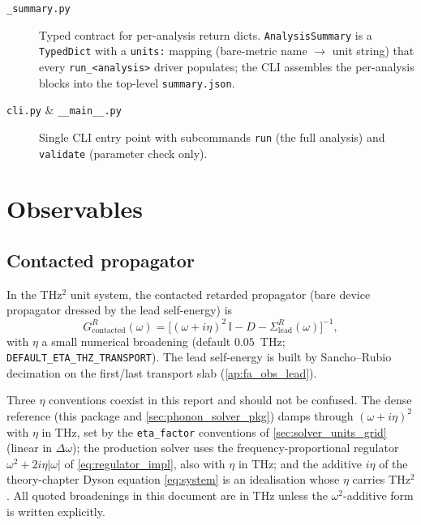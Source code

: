 \begin{description}
\item[\texttt{\_summary.py}] Typed contract for per-analysis return
  dicts.  \texttt{AnalysisSummary} is a \texttt{TypedDict} with a
  \texttt{units:} mapping (bare-metric name $\to$ unit string) that
  every \texttt{run\_<analysis>} driver populates; the CLI assembles
  the per-analysis blocks into the top-level \texttt{summary.json}.

\item[\texttt{cli.py} \& \texttt{\_\_main\_\_.py}] Single CLI entry point
  with subcommands \texttt{run} (the full analysis) and
  \texttt{validate} (parameter check only).
\end{description}

\section{Observables}
\label{ap:fa_observables}

\subsection{Contacted propagator}
\label{ap:fa_obs_bare}

In the THz$^2$ unit system, the contacted retarded propagator
(bare device propagator dressed by the lead self-energy) is
\begin{equation}
  \label{eq:gf_retarded_bare}
  G^R_{\mathrm{contacted}}(\omega) =
  \bigl[(\omega + i\eta)^2\,\mathbb{I} - D - \Sigma^R_{\mathrm{lead}}(\omega)\bigr]^{-1},
\end{equation}
with $\eta$ a small numerical broadening (default
$0.05$~THz; \texttt{DEFAULT\_ETA\_THZ\_TRANSPORT}).  The lead
self-energy is built by Sancho--Rubio decimation on the first/last
transport slab (\cref{ap:fa_obs_lead}).

Three $\eta$ conventions coexist in this report and should not be
confused.  The dense reference (this package and
\cref{sec:phonon_solver_pkg}) damps through $(\omega+i\eta)^2$ with
$\eta$ in THz, set by the \texttt{eta\_factor} conventions of
\cref{sec:solver_units_grid} (linear in $\Delta\omega$); the
production solver uses the frequency-proportional regulator
$\omega^2+2i\eta|\omega|$ of \cref{eq:regulator_impl}, also with
$\eta$ in THz; and the additive $i\eta$ of the theory-chapter Dyson
equation \cref{eq:system} is an idealisation whose $\eta$ carries
THz$^2$.  All quoted broadenings in this document are in THz unless
the $\omega^2$-additive form is written explicitly.

